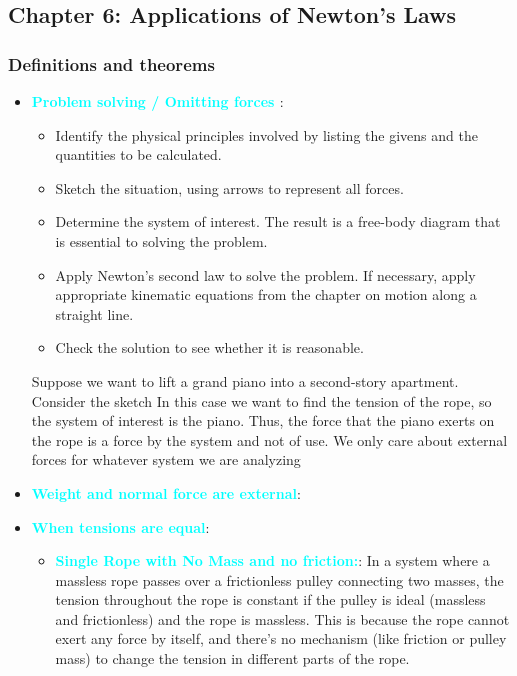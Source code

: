 \documentclass{report}
\begin{document}
    \pagebreak 
    \subsection{Chapter 6: Applications of Newton's Laws}
    \bigbreak \noindent 
    \subsubsection{Definitions and theorems}
    \begin{itemize}
        \item \textbf{\textcolor{cyan}{Problem solving / Omitting forces }}: 
            \begin{itemize}
                \item Identify the physical principles involved by listing the givens and the quantities to be calculated.
                \item Sketch the situation, using arrows to represent all forces.
                \item Determine the system of interest. The result is a free-body diagram that is essential to solving the problem.
                \item Apply Newton’s second law to solve the problem. If necessary, apply appropriate kinematic equations from the chapter on motion along a straight line.
                \item Check the solution to see whether it is reasonable.
            \end{itemize}
            Suppose we want to lift a grand piano into a second-story apartment. Consider the sketch
            \bigbreak \noindent
            \bigbreak \noindent 
            In this case we want to find the tension of the rope, so the system of interest is the piano. Thus, the force that the piano exerts on the rope is a force by the system and not of use. We only care about external forces for whatever system we are analyzing
        \item \textbf{\textcolor{cyan}{Weight and normal force are external}}:
        \item \textbf{\textcolor{cyan}{When tensions are equal}}:
            \begin{itemize}
                \item \textbf{\textcolor{cyan}{Single Rope with No Mass and no friction:}}: In a system where a massless rope passes over a frictionless pulley connecting two masses, the tension throughout the rope is constant if the pulley is ideal (massless and frictionless) and the rope is massless. This is because the rope cannot exert any force by itself, and there's no mechanism (like friction or pulley mass) to change the tension in different parts of the rope.

\end{itemize}
\end{itemize}
\end{document}
